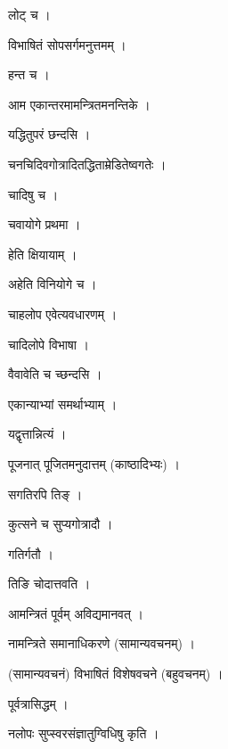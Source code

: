 \documentclass[10pt, openany]{book}
\begin{document}
\noindent लोट् च ।

\noindent विभाषितं सोपसर्गमनुत्तमम् ।

\noindent हन्त च ।

\noindent आम एकान्तरमामन्त्रितमनन्तिके ।

\noindent यद्धितुपरं छन्दसि ।

\noindent चनचिदिवगोत्रादितद्धिताम्रेडितेष्वगतेः ।

\noindent चादिषु च ।

\noindent चवायोगे प्रथमा ।

\noindent हेति क्षियायाम् ।

\noindent अहेति विनियोगे च ।

\noindent चाहलोप एवेत्यवधारणम् ।

\noindent चादिलोपे विभाषा ।

\noindent वैवावेति च च्छन्दसि ।

\noindent एकान्याभ्यां समर्थाभ्याम् ।

\noindent यद्वृत्तान्नित्यं ।

\noindent पूजनात् पूजितमनुदात्तम् (काष्ठादिभ्यः) ।

\noindent सगतिरपि तिङ् ।

\noindent कुत्सने च सुप्यगोत्रादौ ।

\noindent गतिर्गतौ ।

\noindent तिङि चोदात्तवति ।

\noindent आमन्त्रितं पूर्वम् अविद्यमानवत् ।

\noindent नामन्त्रिते समानाधिकरणे (सामान्यवचनम्) ।

\noindent (सामान्यवचनं) विभाषितं विशेषवचने (बहुवचनम्) ।

\noindent पूर्वत्रासिद्धम् ।

\noindent नलोपः सुप्स्वरसंज्ञातुग्विधिषु कृति ।
\end{document}
